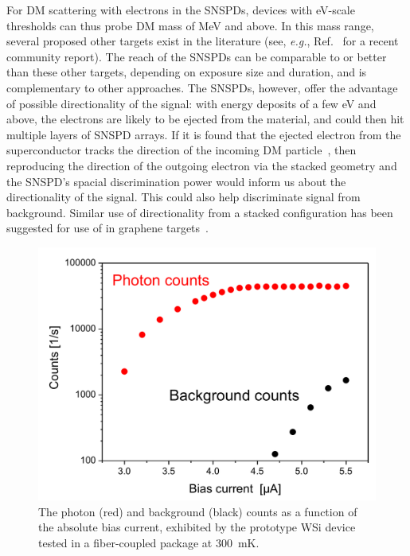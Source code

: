 \documentclass[twocolumn,10pt,prl,nofootinbib,preprintnumbers]{revtex4-1}
\begin{document}
For DM scattering with electrons in the SNSPDs, devices with eV-scale
thresholds can thus probe DM mass of MeV and above. In this mass
range, several proposed other targets exist in the literature (see,
{\it e.g.}, Ref.~\cite{Battaglieri:2017aum} for a recent community
report).  The reach of the SNSPDs can be comparable to or better than
these other targets, depending on exposure size and duration, and is complementary
to other approaches. The SNSPDs, however, offer the advantage of
possible directionality of the signal: with energy deposits of a few
eV and above, the electrons are likely to be ejected from the
material, and could then hit multiple layers of SNSPD arrays.  If it
is found that the ejected electron from the superconductor tracks the
direction of the incoming DM particle~\cite{SCdir}, then reproducing
the direction of the outgoing electron via the stacked geometry and the SNSPD's spacial discrimination power would
inform us about the directionality of the signal. This could also
help discriminate signal from background. Similar use of
directionality from a stacked configuration has been suggested for use
of in graphene targets~\cite{Hochberg:2016ntt}.

\begin{figure}[t]
\includegraphics[width=.48\textwidth]{Plots/PCR.pdf}
\caption{\label{fig:pcr} The photon (red) and background (black)
  counts as a function of the absolute bias current, exhibited by the prototype WSi device tested in a fiber-coupled package at \SI{300}{\milli\kelvin}. }
\end{figure}
\end{document}
